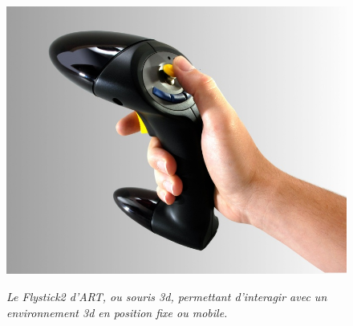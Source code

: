 \begin{figure}
  \centering
  {\includegraphics[width=.55\linewidth]{./figures/ch2/art_flystick}}
    \caption[Flystick, ou souris 3d.]{{\it Le Flystick2 d'ART, ou souris 3d, permettant d'interagir avec un environnement 3d en position fixe ou mobile.}}
  \label{Fig:art_flystick}
  \hspace{0.3cm}
\end{figure}

